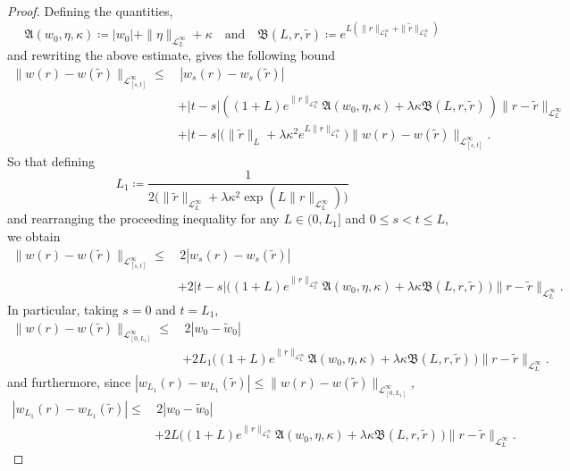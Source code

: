 \documentclass[11pt,oneside,english,reqno,dvipsnames,table]{amsart}
\numberwithin{equation}{section}
\theoremstyle{plain}
\theoremstyle{definition}
\theoremstyle{remark}
\theoremstyle{plain}
\theoremstyle{plain}
\theoremstyle{plain}
\theoremstyle{plain}
\theoremstyle{plain}
\theoremstyle{plain}
\theoremstyle{plain}
\newcommand{\mfA}{\mathfrak{A}}
\newcommand{\mfB}{\mathfrak{B}}
\newcommand{\msL}{\mathscr{L}}
\numberwithin{thm}{section}
\begin{document}
\begin{proof}
Defining the quantities,
%
\begin{equation*}
     \mfA(w_0,\eta,\kappa) \coloneqq |w_0| +  \|\eta\|_{\msL^\infty_L}+ \kappa \quad \text{and}\quad \mfB(L,r,\tilde{r}) \coloneqq e^{L\left(\|r\|_{\msL^\infty_L}+\|\tilde{r}\|_{\msL^\infty_L}\right)}
\end{equation*}
%
and rewriting the above estimate, gives the following bound
%
\begin{align*}
    \|w(r)-w(\tilde{r})\|_{\msL^\infty_{[s,t]}} \leq & \, |w_s(r)-w_s(\tilde{r})|\\
    &+|t-s|\left( (1+L)e^{\|r\|_{\msL^\infty_L}} \mfA(w_0,\eta,\kappa) +  \lambda  \kappa \mfB(L,r,\tilde{r})\, \right)\|r-\tilde{r}\|_{\msL^\infty_L}\\
   & + |t-s|\bigg(\|\tilde{r}\|_L + \lambda \kappa^2 e^{L\|r\|_{\msL^\infty_L} }\bigg)\|w(r)-w(\tilde{r})\|_{\msL^\infty_{[s,t]}}.
\end{align*}
So that defining
%
\begin{equation*}
    L_1 \coloneqq \frac{1}{2\bigg(\|\tilde{r}\|_{\msL^\infty_L} + \lambda \kappa^2 \exp\left(L\|r\|_{\msL^\infty_L}  \right)\bigg)}
\end{equation*}
%
and rearranging the proceeding inequality for any $L\in (0,L_1]$ and $0\leq s<t\leq L$, we obtain
%
\begin{align*}
     \|w(r)-w(\tilde{r})\|_{\msL^\infty_{[s,t]}} \leq& \, 2|w_s(r)-w_s(\tilde{r})|\\
     &+2 |t-s|\bigg( (1+L)e^{\|r\|_{\msL^\infty_L}} \mfA(w_0,\eta,\kappa)  +  \lambda  \kappa \mfB(L,r,\tilde{r})\, \bigg)\|r-\tilde{r}\|_{\msL^\infty_L}.
     \end{align*}
%
In particular, taking $s=0$ and $t= L_1$,
%
\begin{align*}
     \|w(r)-w(\tilde{r})\|_{\msL^\infty_{[0,L_1]}} \leq& \, 2|w_0-\tilde{w}_0|\\
     &+2 L_1\bigg( (1+L)e^{\|r\|_{\msL^\infty_L}} \mfA(w_0,\eta,\kappa)  +  \lambda  \kappa \mfB(L,r,\tilde{r})\, \bigg)\|r-\tilde{r}\|_{\msL^\infty_L}.
\end{align*}
%
and furthermore, since $  |w_{L_1}(r)-w_{L_1}(\tilde{r})|  \leq  \|w(r)-w(\tilde{r})\|_{\msL^\infty_{[0,L_1]}}$,
%
\begin{align*}
    |w_{L_1}(r)-w_{L_1}(\tilde{r})| \leq&  \, 2|w_0-\tilde{w}_0|\\
     &+2 L\bigg( (1+L)e^{\|r\|_{\msL^\infty_L}} \mfA(w_0,\eta,\kappa)  +  \lambda  \kappa \mfB(L,r,\tilde{r})\, \bigg)\|r-\tilde{r}\|_{\msL^\infty_L}.

\end{align*}
\end{proof}
\end{document}
